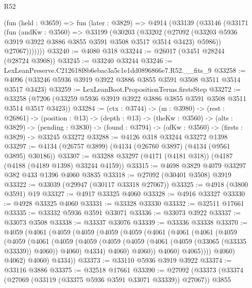 \begin{lexlean}{R52}
\begin{coremodule}
      (fun (held : @3659) =>
      fun (later : @3829) =>
      @4914
        (@33139
          (@33146
            (@33171
              (fun (andKw : @3560) =>
              @33199
                (@30203
                  (@33202
                    (@27092
                      (@33203 @5936 @3919 @3922 @3886 @3855 @3591 @3508 @3517 @3514 @3423)
                      @5986))
                  @27067)))))))
@33240 := @4080 @318
@33244 := @26017 (@3451 @28244 (@28724 @3908))
@33245 := @33240 @33244
@33246 := LexLeanPreserve.C212618f8b6ebac3a5c1e1dd0896866e7.R52.__fits_9
@33258 := @4096 (@33246 @5936 @3919 @3922 @3886 @3855 @3591 @3508 @3511 @3514 @3517 @3423)
@33259 := LexLeanBoot.PropositionTerms.firstsStep
@33272 := @33258 (@7206 (@33259 @5936 @3919 @3922 @3886 @3855 @3591 @3508 @3511 @3514 @3517 @3423))
@33284 := (ctx : @3744) ->
  (m : @3980) ->
  (rest : @26861) ->
  (position : @13) ->
  (depth : @13) ->
  (theKw : @3560) ->
  (alts : @3829) ->
  (pending : @3830) -> (found : @3794) -> (ofKw : @3560) -> (firsts : @3829) -> @33245 @33272
@33288 := @4126 @318 @33244 @33272 @1398
@33297 := @4134 (@26757 @3899) (@4134 (@26760 @3897) (@4134 (@9561 @3895) @30186))
@33307 := @33288 @33297 (@4171 (@4181 @318)) (@4187 (@4188 (@4189 @1398) @33244 @4159))
@33315 := @4698 @3829 @4079 @33297 @382 @433 @1396 @4060 @3835
@33318 := @27092 (@30401 @3508) @3919
@33322 := @33039 (@29947 (@30117 @33318 @27067))
@33325 := @4918 (@3800 @3591) @19
@33327 := @4917 @33325 @4060
@33328 := @4916 @33327
@33330 := @4928 @33325 @4060
@33331 := @33328 @33330
@33332 := @32511 @17661
@33335 := @33332 @5936 @3591 @33071
@33336 := @33073 @3922
@33337 := @33073 @3508
@33338 := @33337 @33076
@33339 := @33336 @33338
@33370 := @4059
    (@4061
      (@4059
        (@4059
          (@4059
            (@4059
              (@4061
                (@4061
                  (@4061
                    (@4059
                      (@4059
                        (@4061
                          (@4059
                            (@4059
                              (@4059
                                (@4059 (@4061 (@4059 (@33065 (@33335 @33339)) @4060)) @4060)
                                @4334)
                              @4060)
                            @4060))
                        @4060)
                      @4065))))
              @4060)
            @4062)
          @4060)
        @4334))
@33373 := @33110 @5936 @3919 @3922
@33374 := @33116 @3886
@33375 := @32518 @17661
@33390 := @27092
    (@33373
      (@33374 (@27069 (@33119 (@33375 @5936 @3591 @33071 @33339)) @27067))
      @3855

\end{coremodule}
\end{lexlean}

